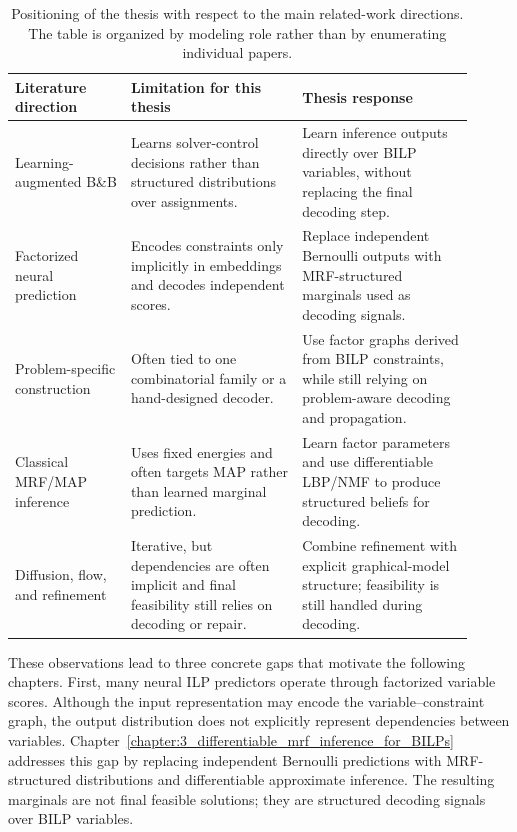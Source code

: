 \begin{table}[t]
    \centering
    \small
    \begin{tabular}{p{0.23\linewidth}p{0.34\linewidth}p{0.34\linewidth}}
        \hline
        Literature direction & Limitation for this thesis & Thesis response \\
        \hline
        Learning-augmented B\&B & Learns solver-control decisions rather than structured distributions over assignments. & Learn inference outputs directly over BILP variables, without replacing the final decoding step. \\
        Factorized neural prediction & Encodes constraints only implicitly in embeddings and decodes independent scores. & Replace independent Bernoulli outputs with MRF-structured marginals used as decoding signals. \\
        Problem-specific construction & Often tied to one combinatorial family or a hand-designed decoder. & Use factor graphs derived from BILP constraints, while still relying on problem-aware decoding and propagation. \\
        Classical MRF/MAP inference & Uses fixed energies and often targets MAP rather than learned marginal prediction. & Learn factor parameters and use differentiable LBP/NMF to produce structured beliefs for decoding. \\
        Diffusion, flow, and refinement & Iterative, but dependencies are often implicit and final feasibility still relies on decoding or repair. & Combine refinement with explicit graphical-model structure; feasibility is still handled during decoding. \\
        \hline
    \end{tabular}
    \caption{Positioning of the thesis with respect to the main related-work directions. The table is organized by modeling role rather than by enumerating individual papers.}
    \label{tab:rw_positioning}
\end{table}

These observations lead to three concrete gaps that motivate the following chapters. First, many neural ILP predictors operate through factorized variable scores. Although the input representation may encode the variable--constraint graph, the output distribution does not explicitly represent dependencies between variables. Chapter~\ref{chapter:3_differentiable_mrf_inference_for_BILPs} addresses this gap by replacing independent Bernoulli predictions with MRF-structured distributions and differentiable approximate inference. The resulting marginals are not final feasible solutions; they are structured decoding signals over BILP variables.

